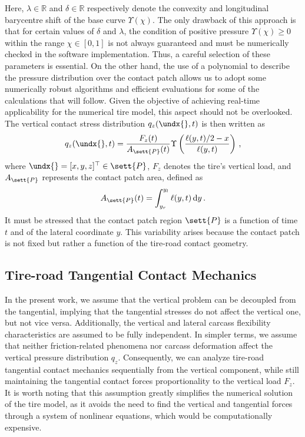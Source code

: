 %
Here, $\lambda \in \mathbb{R}$ and $\delta \in \mathbb{R}$ respectively denote the convexity and longitudinal barycentre shift of the base curve $\Upsilon(\chi)$. The only drawback of this approach is that for certain values of $\delta$ and $\lambda$, the condition of positive pressure $\Upsilon(\chi) \ge 0$ within the range $\chi \in [0,1]$ is not always guaranteed and must be numerically checked in the software implementation. Thus, a careful selection of these parameters is essential. On the other hand, the use of a polynomial to describe the pressure distribution over the contact patch allows us to adopt some numerically robust algorithms and efficient evaluations for some of the calculations that will follow. Given the objective of achieving real-time applicability for the numerical tire model, this aspect should not be overlooked. The vertical contact stress distribution $q_z(\undx{},t)$ is then written as
%
\begin{equation}
  q_z(\undx{},t) = \dfrac{F_z(t)}{A_\sett{P}(t)}\Upsilon\left(\dfrac{\ell(y,t)/2-x}{\ell(y,t)}\right) \, \text{,} \\
  \label{app3:eq:vertical_stress}
\end{equation}
%
where $\undx{} = [x,y,z]^\top \in \sett{P}$, $F_z$ denotes the tire's vertical load, and $A_\sett{P}$ represents the contact patch area, defined as
%
\begin{equation}
  A_\sett{P}(t) = \displaystyle\int_{y_r}^{y_l} \ell(y,t)\,\mathrm{d}y \, \text{.}
\end{equation}
%
It must be stressed that the contact patch region $\sett{P}$ is a function of time $t$ and of the lateral coordinate $y$. This variability arises because the contact patch is not fixed but rather a function of the tire-road contact geometry.


\subsection{Tire-road Tangential Contact Mechanics}
\label{app3:sec:tangential_contact}

In the present work, we assume that the vertical problem can be decoupled from the tangential, implying that the tangential stresses do not affect the vertical one, but not vice versa. Additionally, the vertical and lateral carcass flexibility characteristics are assumed to be fully independent. In simpler terms, we assume that neither friction-related phenomena nor carcass deformation affect the vertical pressure distribution $q_z$. Consequently, we can analyze tire-road tangential contact mechanics sequentially from the vertical component, while still maintaining the tangential contact forces proportionality to the vertical load $F_z$. It is worth noting that this assumption greatly simplifies the numerical solution of the tire model, as it avoids the need to find the vertical and tangential forces through a system of nonlinear equations, which would be computationally expensive.

